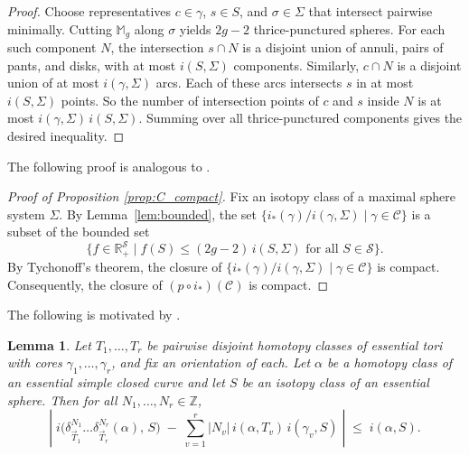 \documentclass[12pt,a4paper]{amsart}
\numberwithin{equation}{section}
\newcommand{\MM}{\mathbb{M}}
\newcommand{\ZZ}{\mathbb{Z}}
\theoremstyle{plain}
\newtheorem{lemma}[theorem]{Lemma}
\theoremstyle{definition}
\theoremstyle{remark}
\begin{document}
\begin{proof}
    Choose representatives \(c \in \gamma\), \(s \in S\), and \(\sigma \in \Sigma\) that intersect pairwise minimally.
    Cutting \(\MM_g\) along \(\sigma\) yields \(2g-2\) thrice-punctured spheres.
    For each such component \(N\), the intersection \(s \cap N\) is a disjoint union of annuli, pairs of pants, and disks, with at most \(i(S,\Sigma)\) components.
    Similarly, \(c \cap N\) is a disjoint union of at most \(i(\gamma,\Sigma)\) arcs.
    Each of these arcs intersects \(s\) in at most \(i(S,\Sigma)\) points.
    So the number of intersection points of \(c\) and \(s\) inside \(N\) is at most \(i(\gamma,\Sigma)\,i(S,\Sigma)\).
    Summing over all thrice-punctured components gives the desired inequality.
\end{proof}

The following proof is analogous to \cite[Proposition 4.1]{MR3053012}.

\begin{proof}[Proof of Proposition \ref{prop:C_compact}]
    Fix an isotopy class of a maximal sphere system \(\Sigma\).  
    By Lemma~\ref{lem:bounded}, the set $\{ i_*(\gamma)/i(\gamma, \Sigma) \mid \gamma \in \mathcal{C} \}$ is a subset of the bounded set
    \[
        \{ f \in \mathbb{R}_{+}^{\mathcal{S}} \mid f(S) \le (2g - 2)\, i(S, \Sigma) \text{ for all } S \in \mathcal{S} \}.
    \]
    By Tychonoff's theorem, the closure of 
    \(\{ i_*(\gamma)/i(\gamma, \Sigma) \mid \gamma \in \mathcal{C} \}\) 
    is compact.  
    Consequently, the closure of \((p \circ i_*)(\mathcal{C})\) is compact.
\end{proof}




The following is motivated by \cite[Proposition A.1]{MR3053012}.

\begin{lemma} \label{lem:disjoint_twist_growth}
    Let $T_1, \dots, T_r$ be pairwise disjoint homotopy classes of essential tori with cores $\gamma_1, \dots, \gamma_r$, and fix an orientation of each.
    Let $\alpha$ be a homotopy class of an essential simple closed curve and let $S$ be an isotopy class of an essential sphere.
    Then for all $N_1, \dots, N_r \in \ZZ$,
    \[
        \left\lvert\;
        i\bigl(\delta_{\vec T_1}^{N_1} \dots \delta_{\vec T_r}^{N_r}(\alpha),\, S\bigr)
        \;-\;
        \sum_{v=1}^{r} \lvert N_v \rvert \, i(\alpha, T_v) \, i(\gamma_v, S)
        \;\right\rvert
        \;\le\; i(\alpha, S).
    \]
\end{lemma}
\end{document}
